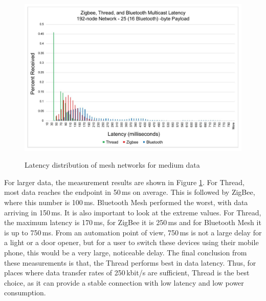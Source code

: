 \begin{figure}[!h]
    \centering
    \includegraphics[width=\textwidth]{img/mesh-large-network-moderate-payload.png}
    \caption{Latency distribution of mesh networks for medium data}
    \label{fig:threadmoderateload}
    \cite{threadSilabs}
\end{figure}
\noindent
For larger data, the measurement results are shown in Figure \ref{fig:threadmoderateload}. For Thread, most data reaches the endpoint in 50\,\si{\milli s} on average. This is followed by ZigBee, where this number is 100\,\si{\milli s}. Bluetooth Mesh performed the worst, with data arriving in 150\,\si{\milli s}. It is also important to look at the extreme values. For Thread, the maximum latency is 170\,\si{\milli s}, for ZigBee it is 250\,\si{\milli s} and for Bluetooth Mesh it is up to 750\,\si{\milli s}. From an automation point of view, 750\,\si{\milli s} is not a large delay for a light or a door opener, but for a user to switch these devices using their mobile phone, this would be a very large, noticeable delay.
\newline
The final conclusion from these measurements is that, the Thread performs best in data latency. Thus, for places where data transfer rates of 250\,\si{\kilo bit/s} are sufficient, Thread is the best choice, as it can provide a stable connection with low latency and low power consumption.


